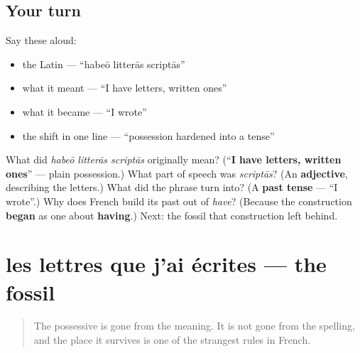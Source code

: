 \subsection*{Your turn}
Say these aloud:

\begin{itemize}
\raggedright
  \item the Latin — \textquotedblleft{}habeō litterās scriptās\textquotedblright{}
  \item what it meant — \textquotedblleft{}I have letters, written ones\textquotedblright{}
  \item what it became — \textquotedblleft{}I wrote\textquotedblright{}
  \item the shift in one line — \textquotedblleft{}possession hardened into a tense\textquotedblright{}
\end{itemize}

\begin{tcolorbox}[breakable,colback=teal!4,colframe=teal!35!black,title={Before you move on}]
What did \emph{habeō litterās scriptās} originally mean? (\textquotedblleft{}\textbf{I have letters, written ones}\textquotedblright{} — plain possession.) What part of speech was \emph{scriptās}? (An \textbf{adjective}, describing the letters.) What did the phrase turn into? (A \textbf{past tense} — \textquotedblleft{}I wrote\textquotedblright{}.) Why does French build its past out of \emph{have}? (Because the construction \textbf{began} as one about \textbf{having}.) Next: the fossil that construction left behind.
\end{tcolorbox}
\section[les lettres que j'ai écrites]{les lettres que j'ai écrites — the fossil}

\label{lesson:FR-C15-accord}



\begin{quote}
The possessive is gone from the meaning. It is not gone from the spelling, and the place it survives is one of the strangest rules in French.
\end{quote}

